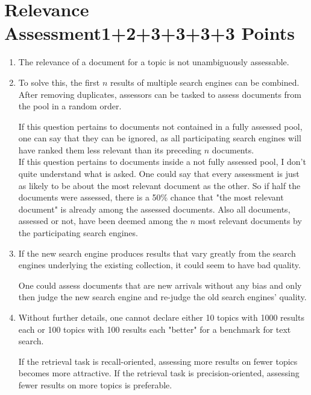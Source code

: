 \documentclass[10pt,a4paper]{article}
\begin{document}
\section{\hfill Relevance Assessment\hfill 1+2+3+3+3+3 Points}
\begin{enumerate}
    \item The relevance of a document for a topic is not unambiguously assessable.
    \item To solve this, the first $n$ results of multiple search engines can be combined. After removing duplicates, assessors can be tasked to assess documents from the pool in a random order.
    
    If this question pertains to documents not contained in a fully assessed pool, one can say that they can be ignored, as all participating search engines will have ranked them less relevant than its preceding $n$ documents.\\
    If this question pertains to documents inside a not fully assessed pool, I don't quite understand what is asked. One could say that every assessment is just as likely to be about the most relevant document as the other. So if half the documents were assessed, there is a 50\% chance that "the most relevant document" is already among the assessed documents. Also all documents, assessed or not, have been deemed among the $n$ most relevant documents by the participating search engines.
    \item If the new search engine produces results that vary greatly from the search engines underlying the existing collection, it could seem to have bad quality.
    
    One could assess documents that are new arrivals without any bias and only then judge the new search engine and re-judge the old search engines' quality.
    \item Without further details, one cannot declare either 10 topics with 1000 results each or 100 topics with 100 results each "better" for a benchmark for text search.
    
        If the retrieval task is recall-oriented, assessing more results on fewer topics becomes more attractive. If the retrieval task is precision-oriented, assessing fewer results on more topics is preferable.
        

\end{enumerate}
\end{document}
